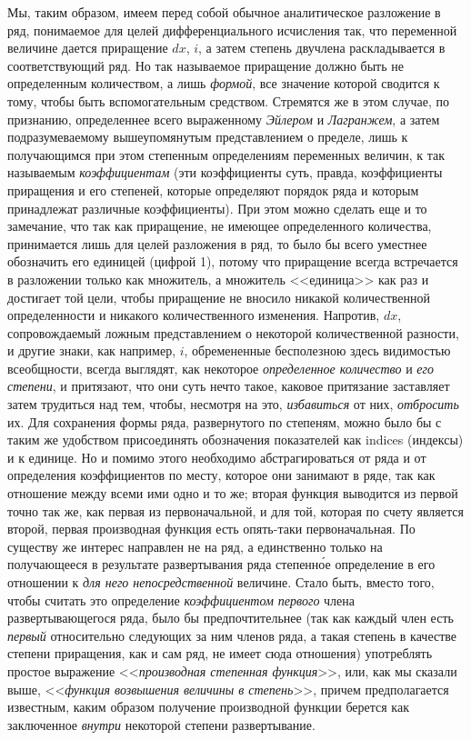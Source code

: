 Мы, таким образом, имеем перед собой обычное аналитическое разложение в ряд,
понимаемое для целей дифференциального исчисления так, что переменной
величине дается приращение $dx$,
$i$, а затем степень двучлена раскладывается в
соответствующий ряд. Но так называемое приращение должно быть не
определенным количеством, а лишь {\em формой}, все
значение которой сводится к тому, чтобы быть вспомогательным средством.
Стремятся же в этом случае, по признанию, определеннее всего выраженному
{\em Эйлером} и {\em Лагранжем}, а
затем подразумеваемому вышеупомянутым представлением о пределе, лишь к
получающимся при этом степенным определениям переменных величин, к так
называемым {\em коэффициентам} (эти коэффициенты суть,
правда, коэффициенты приращения и его степеней, которые определяют порядок
ряда и которым принадлежат различные коэффициенты). При этом можно сделать
еще и то замечание, что так как приращение, не имеющее определенного
количества, принимается лишь для целей разложения в ряд, то было бы всего
уместнее обозначить его единицей (цифрой 1), потому что приращение всегда
встречается в разложении только как множитель, а множитель <<единица>> как
раз и достигает той цели, чтобы приращение не вносило никакой
количественной определенности и никакого количественного изменения.
Напротив, $dx$, сопровождаемый ложным
представлением о некоторой количественной разности, и другие знаки, как
например, $i$, обремененные бесполезною здесь
видимостью всеобщности, всегда выглядят, как некоторое
{\em определенное количество} и
{\em его степени}, и притязают, что они суть нечто
такое, каковое притязание заставляет затем трудиться над тем, чтобы,
несмотря на это, {\em избавиться} от них,
{\em отбросить} их. Для сохранения формы ряда,
развернутого по степеням, можно было бы с таким же удобством присоединять
обозначения показателей как indices (индексы) и к единице. Но и помимо
этого необходимо абстрагироваться от ряда и от определения коэффициентов по
месту, которое они занимают в ряде, так как отношение между всеми ими одно
и то же; вторая функция выводится из первой точно так же, как первая из
первоначальной, и для той, которая по счету является второй, первая
производная функция есть опять-таки первоначальная. По существу же интерес
направлен не на ряд, а единственно только на получающееся в результате
развертывания ряда степенн\'{о}е определение в его отношении к
{\em для него непосредственной} величине. Стало быть,
вместо того, чтобы считать это определение
{\em коэффициентом первого} члена развертывающегося
ряда, было бы предпочтительнее (так как каждый член есть
{\em первый} относительно следующих за ним членов ряда,
а такая степень в качестве степени приращения, как и сам ряд, не имеет сюда
отношения) употреблять простое выражение
<<{\em производная степенная функция}>>, или, как мы
сказали выше, <<{\em функция возвышения величины в
степень}>>, причем предполагается известным, каким образом получение
производной функции берется как заключенное
{\em внутри} некоторой степени развертывание.

